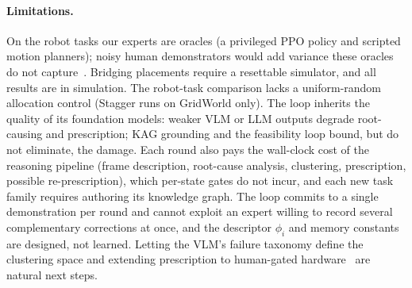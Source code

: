 \documentclass[letterpaper]{article} %
\begin{document}
\paragraph{Limitations.}
On the robot tasks our experts are oracles (a privileged PPO policy and
scripted motion planners); noisy human demonstrators would add variance
these oracles do not capture~\citep{mandlekar2020iwr,liu2023sirius}. Bridging placements require
a resettable simulator, and all results are in simulation. The robot-task
comparison lacks a uniform-random allocation control (Stagger runs on
GridWorld only). The loop inherits
the quality of its foundation models: weaker VLM or LLM outputs degrade
root-causing and prescription; KAG grounding and the feasibility loop
bound, but do not eliminate, the damage. Each round also pays the
wall-clock cost of the reasoning pipeline (frame description, root-cause
analysis, clustering, prescription, possible re-prescription), which
per-state gates do not incur, and each new task family requires authoring
its knowledge graph. The loop
commits to a single demonstration per round and cannot exploit an expert
willing to record several complementary corrections at once, and the
descriptor $\phi_i$ and memory constants are designed, not learned. Letting
the VLM's failure taxonomy define the clustering space and extending
prescription to human-gated hardware~\citep{kelly2019hgdagger} are natural
next steps.



\end{document}

